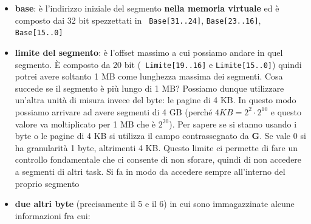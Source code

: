 \documentclass[11pt]{book}
\begin{document}
\begin{itemize}
\item {\bf base}: \`e l'indirizzo iniziale del segmento \textbf{nella
    memoria virtuale} ed \`e composto dai 32 bit spezzettati in {\tt
    Base[31..24]}, {\tt Base[23..16]}, {\tt Base[15..0]}
\item {\bf limite del segmento}: \`e l'offset massimo a cui possiamo
  andare in quel segmento. \`E composto da 20 bit ({\tt
    Limite[19..16]} e {\tt Limite[15..0]}) quindi potrei avere
  soltanto 1 MB come lunghezza massima dei segmenti. Cosa succede se
  il segmento \`e pi\`u lungo di 1 MB? Possiamo dunque utilizzare
  un'altra unit\`a di misura invece del byte: le pagine di 4 KB. In
  questo modo possiamo arrivare ad avere segmenti di 4 GB (perch\'e $4
  KB = 2^2 \cdot 2^{10}$ e questo valore va moltiplicato per 1 MB che
  \`e $2^{20}$). Per sapere se si stanno usando i byte o le pagine di
  4 KB si utilizza il campo contrassegnato da {\bf G}. Se vale 0 si ha
  granularit\`a 1 byte, altrimenti 4 KB. Questo limite ci permette di
  fare un controllo fondamentale che ci consente di non sforare,
  quindi di non accedere a segmenti di altri task. Si fa in modo da
  accedere sempre all'interno del proprio segmento

\item {\bf due altri byte} (precisamente il 5 e il 6) in cui sono
  immagazzinate alcune informazioni fra cui:


\end{itemize}
\end{document}
